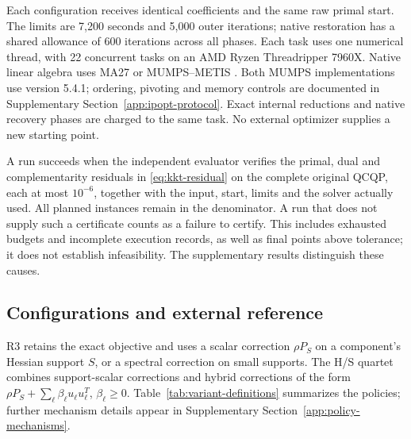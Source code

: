 \documentclass[pdflatex,sn-mathphys-num]{sn-jnl}
\theoremstyle{thmstyleone}
\theoremstyle{thmstylethree}
\begin{document}
Each configuration receives identical coefficients and the same raw primal
start. The limits are 7,200 seconds and 5,000 outer iterations; native
restoration has a shared allowance of 600 iterations across all phases.
Each task uses one numerical thread, with 22 concurrent tasks on an AMD
Ryzen Threadripper 7960X. Native linear algebra uses MA27 or MUMPS--METIS
\citep{AmestoyDuffExcellentKoster2001}. Both MUMPS implementations use
version 5.4.1; ordering, pivoting and memory controls are documented in
Supplementary Section~\ref{app:ipopt-protocol}. Exact internal reductions and native
recovery phases are charged to the same task. No external optimizer
supplies a new starting point.

A run succeeds when the independent evaluator verifies the primal, dual
and complementarity residuals in \eqref{eq:kkt-residual} on the complete
original QCQP, each at most $10^{-6}$, together with the input, start,
limits and the solver actually used. All planned instances remain in the
denominator. A run that does not supply such a certificate counts as a
failure to certify. This includes exhausted budgets and incomplete
execution records, as well as final points above tolerance; it does not
establish infeasibility. The supplementary results distinguish these
causes.

\subsection{Configurations and external reference}
R3 retains the exact objective and uses a scalar correction $\rho P_S$ on a component's Hessian
support $S$, or a spectral correction on small supports. The H/S quartet
combines support-scalar corrections and hybrid corrections of the form
$\rho P_S+\sum_\ell\beta_\ell u_\ell u_\ell^T$, $\beta_\ell\geq0$.
Table~\ref{tab:variant-definitions} summarizes the policies; further
mechanism details appear in Supplementary
Section~\ref{app:policy-mechanisms}.
\end{document}
